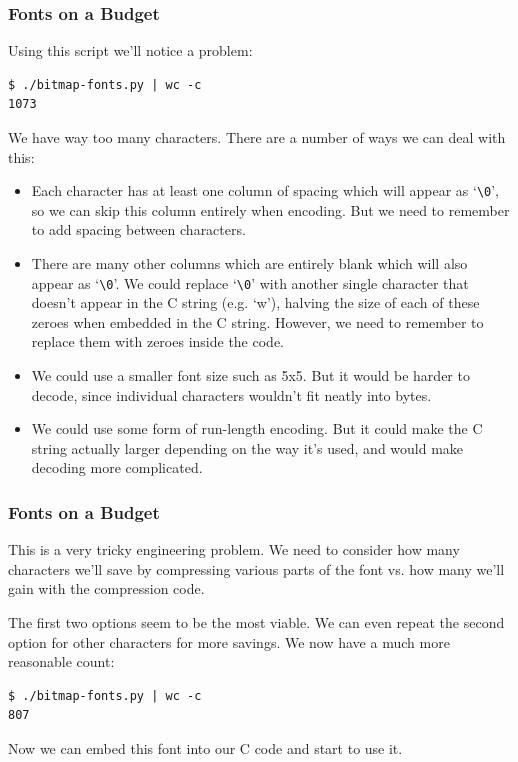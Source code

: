 \documentclass[xcolor]{beamer}
\begin{document}
\begin{frame}[fragile]
	\frametitle{Fonts on a Budget}
	\pause
	
	Using this script we'll notice a problem:
	
	\begin{lstlisting}
$ ./bitmap-fonts.py | wc -c
1073\end{lstlisting}
	
	We have way too many characters. There are a number of ways we can deal with this:
	
	\begin{itemize}
		\footnotesize
		\item Each character has at least one column of spacing which will appear as `\texttt{\textbackslash0}', so we can skip this column entirely when encoding. \pause But we need to remember to add spacing between characters.
		\pause
		
		\item There are many other columns which are entirely blank which will also appear as `\texttt{\textbackslash0}'. We could replace `\texttt{\textbackslash0}' with another single character that doesn't appear in the C string (e.g. `w'), halving the size of each of these zeroes when embedded in the C string. \pause However, we need to remember to replace them with zeroes inside the code.
		\pause
		
		\item We could use a smaller font size such as 5x5. \pause But it would be harder to decode, since individual characters wouldn't fit neatly into bytes.
		\pause
		
		\item We could use some form of run-length encoding. \pause But it could make the C string actually larger depending on the way it's used, and would make decoding more complicated.
	\end{itemize}
\end{frame}

\begin{frame}[fragile]
	\frametitle{Fonts on a Budget}
	\pause
	
	This is a very tricky engineering problem. We need to consider how many characters we'll save by compressing various parts of the font vs. how many we'll gain with the compression code.
	\pause
	
	The first two options seem to be the most viable. We can even repeat the second option for other characters for more savings. We now have a much more reasonable count:
	\pause
	
	\begin{lstlisting}
$ ./bitmap-fonts.py | wc -c
807\end{lstlisting}
	\pause

	Now we can embed this font into our C code and start to use it.
\end{frame}
\end{document}
